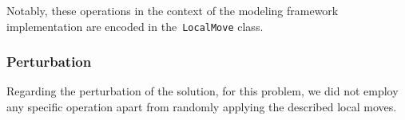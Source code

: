 Notably, these operations in the context of the modeling framework
implementation are encoded in the~\texttt{LocalMove} class.

\subsubsection*{Perturbation}

Regarding the perturbation of the solution, for this problem, we did not employ
any specific operation apart from randomly applying the described local moves.